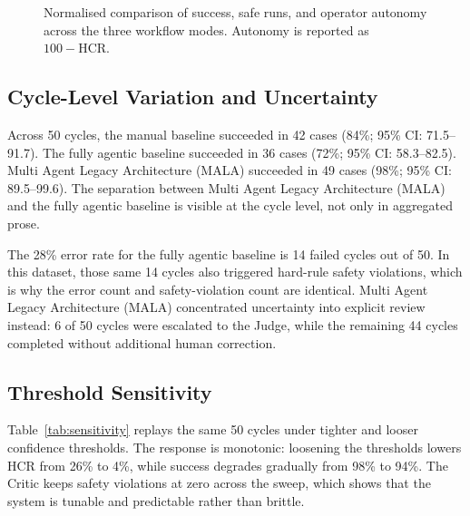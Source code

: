 \documentclass[conference]{IEEEtran}
\newcommand{\MALA}{Multi Agent Legacy Architecture (MALA)}
\begin{document}
\begin{figure}[!t]
\centering
\sffamily
{}
\caption{Normalised comparison of success, safe runs, and operator autonomy across the three workflow modes. Autonomy is reported as $100-\mathrm{HCR}$.}\label{fig:performance}
\end{figure}

\subsection{Cycle-Level Variation and Uncertainty}

Across 50 cycles, the manual baseline succeeded in 42 cases (84\%; 95\% CI: 71.5--91.7). The fully agentic baseline succeeded in 36 cases (72\%; 95\% CI: 58.3--82.5). \MALA{} succeeded in 49 cases (98\%; 95\% CI: 89.5--99.6). The separation between \MALA{} and the fully agentic baseline is visible at the cycle level, not only in aggregated prose.

The 28\% error rate for the fully agentic baseline is 14 failed cycles out of 50. In this dataset, those same 14 cycles also triggered hard-rule safety violations, which is why the error count and safety-violation count are identical. \MALA{} concentrated uncertainty into explicit review instead: 6 of 50 cycles were escalated to the Judge, while the remaining 44 cycles completed without additional human correction.

\subsection{Threshold Sensitivity}

Table~\ref{tab:sensitivity} replays the same 50 cycles under tighter and looser confidence thresholds. The response is monotonic: loosening the thresholds lowers HCR from 26\% to 4\%, while success degrades gradually from 98\% to 94\%. The Critic keeps safety violations at zero across the sweep, which shows that the system is tunable and predictable rather than brittle.
\end{document}
